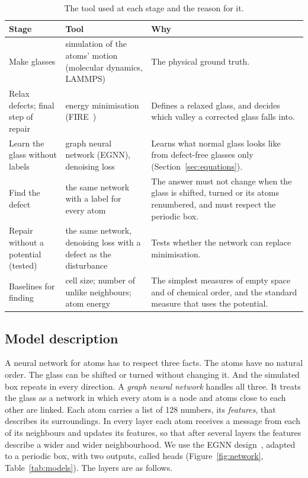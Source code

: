 \documentclass[10pt]{article}
\begin{document}
\begin{table}[t]
\centering
\caption{The tool used at each stage and the reason for it.}
\label{tab:stages}
\small
\begin{tabularx}{\linewidth}{@{}l>{\raggedright\arraybackslash}p{1.55in}>{\raggedright\arraybackslash}X@{}}
\toprule
Stage & Tool & Why \\
\midrule
Make glasses & simulation of the atoms' motion (molecular dynamics, LAMMPS) & The physical ground truth. \\
Relax defects; final step of repair & energy minimisation (FIRE~\citep{bitzek2006fire}) & Defines a relaxed glass, and decides which valley a corrected glass falls into. \\
Learn the glass without labels & graph neural network (EGNN), denoising loss & Learns what normal glass looks like from defect-free glasses only (Section~\ref{sec:equations}). \\
Find the defect & the same network with a label for every atom & The answer must not change when the glass is shifted, turned or its atoms renumbered, and must respect the periodic box. \\
Repair without a potential (tested) & the same network, denoising loss with a defect as the disturbance & Tests whether the network can replace minimisation. \\
Baselines for finding & cell size; number of unlike neighbours; atom energy & The simplest measures of empty space and of chemical order, and the standard measure that uses the potential. \\
\bottomrule
\end{tabularx}
\end{table}

\subsection{Model description}
\label{sec:model}

A neural network for atoms has to respect three facts. The atoms have no natural order. The glass can be shifted or turned without changing it. And the simulated box repeats in every direction. A \emph{graph neural network} handles all three. It treats the glass as a network in which every atom is a node and atoms close to each other are linked. Each atom carries a list of 128 numbers, its \emph{features}, that describes its surroundings. In every layer each atom receives a message from each of its neighbours and updates its features, so that after several layers the features describe a wider and wider neighbourhood. We use the EGNN design~\citep{satorras2021egnn}, adapted to a periodic box, with two outputs, called heads (Figure~\ref{fig:network}, Table~\ref{tab:models}). The layers are as follows.
\end{document}
